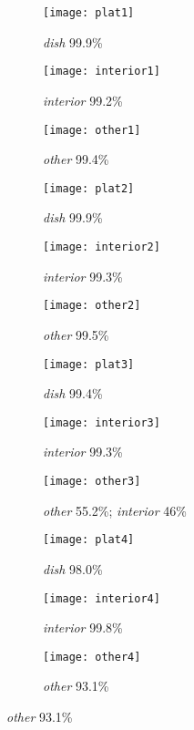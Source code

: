 \documentclass[11pt, oneside]{article}   	%
\begin{document}
\begin{figure}
\centering
\begin{subfigure}{.3\textwidth}
	\centering
	\texttt{[image: plat1]}
	\caption{\textit{dish} 99.9\%}
	\label{A subfigure label}
\end{subfigure}%
\begin{subfigure}{.3\textwidth}
	\centering
	\texttt{[image: interior1]}
	\caption{\textit{interior} 99.2\%}
	\label{A subfigure label}
\end{subfigure}%
\begin{subfigure}{.3\textwidth}
	\centering
	\texttt{[image: other1]}
	\caption{\textit{other} 99.4\%}
	\label{A subfigure label}
\end{subfigure}

\begin{subfigure}{.3\textwidth}
	\centering
	\texttt{[image: plat2]}
	\caption{\textit{dish} 99.9\%}
	\label{A subfigure label}
\end{subfigure}%
\begin{subfigure}{.3\textwidth}
	\centering
	\texttt{[image: interior2]}
	\caption{\textit{interior} 99.3\%}
	\label{A subfigure label}
\end{subfigure}%
\begin{subfigure}{.3\textwidth}
	\centering
	\texttt{[image: other2]}
	\caption{\textit{other} 99.5\%}
	\label{A subfigure label}
\end{subfigure}

\begin{subfigure}{.3\textwidth}
	\centering
	\texttt{[image: plat3]}
	\caption{\textit{dish} 99.4\%}
	\label{A subfigure label}
\end{subfigure}%
\begin{subfigure}{.3\textwidth}
	\centering
	\texttt{[image: interior3]}
	\caption{\textit{interior} 99.3\%}
	\label{A subfigure label}
\end{subfigure}%
\begin{subfigure}{.3\textwidth}
	\centering
	\texttt{[image: other3]}
	\caption{\textit{other} 55.2\%; \textit{interior} 46\%}
	\label{A subfigure label}
\end{subfigure}

\begin{subfigure}{.3\textwidth}
	\centering
	\texttt{[image: plat4]}
	\caption{\textit{dish} 98.0\%}
	\label{A subfigure label}
\end{subfigure}%
\begin{subfigure}{.3\textwidth}
	\centering
	\texttt{[image: interior4]}
	\caption{\textit{interior} 99.8\%}
	\label{A subfigure label}
\end{subfigure}%
\begin{subfigure}{.3\textwidth}
	\centering
	\texttt{[image: other4]}
	\caption{\textit{other} 93.1\%}
	\label{A subfigure label}
\end{subfigure}


\end{figure}
\end{document}
